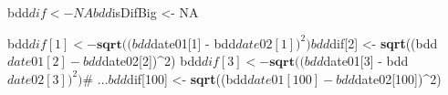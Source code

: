 \documentclass[twoside,symmetric]{book}
\newenvironment{Shaded}{}{}
\newcommand{\CommentTok}[1]{\textit{#1}}
\newcommand{\DecValTok}[1]{#1}
\newcommand{\KeywordTok}[1]{\textbf{#1}}
\newcommand{\NormalTok}[1]{#1}
\newcommand{\OperatorTok}[1]{#1}
\newcommand{\OtherTok}[1]{#1}
\newcommand{\StringTok}[1]{#1}
\begin{document}
\begin{Shaded}
\begin{Highlighting}[]
\NormalTok{bdd}\OperatorTok{$}\NormalTok{dif <-}\StringTok{ }\OtherTok{NA}
\NormalTok{bdd}\OperatorTok{$}\NormalTok{isDifBig <-}\StringTok{ }\OtherTok{NA}

\NormalTok{bdd}\OperatorTok{$}\NormalTok{dif[}\DecValTok{1}\NormalTok{] <-}\StringTok{ }\KeywordTok{sqrt}\NormalTok{((bdd}\OperatorTok{$}\NormalTok{date01[}\DecValTok{1}\NormalTok{] }\OperatorTok{-}\StringTok{ }\NormalTok{bdd}\OperatorTok{$}\NormalTok{date02[}\DecValTok{1}\NormalTok{])}\OperatorTok{^}\DecValTok{2}\NormalTok{)}
\NormalTok{bdd}\OperatorTok{$}\NormalTok{dif[}\DecValTok{2}\NormalTok{] <-}\StringTok{ }\KeywordTok{sqrt}\NormalTok{((bdd}\OperatorTok{$}\NormalTok{date01[}\DecValTok{2}\NormalTok{] }\OperatorTok{-}\StringTok{ }\NormalTok{bdd}\OperatorTok{$}\NormalTok{date02[}\DecValTok{2}\NormalTok{])}\OperatorTok{^}\DecValTok{2}\NormalTok{)}
\NormalTok{bdd}\OperatorTok{$}\NormalTok{dif[}\DecValTok{3}\NormalTok{] <-}\StringTok{ }\KeywordTok{sqrt}\NormalTok{((bdd}\OperatorTok{$}\NormalTok{date01[}\DecValTok{3}\NormalTok{] }\OperatorTok{-}\StringTok{ }\NormalTok{bdd}\OperatorTok{$}\NormalTok{date02[}\DecValTok{3}\NormalTok{])}\OperatorTok{^}\DecValTok{2}\NormalTok{)}
\CommentTok{# ...}
\NormalTok{bdd}\OperatorTok{$}\NormalTok{dif[}\DecValTok{100}\NormalTok{] <-}\StringTok{ }\KeywordTok{sqrt}\NormalTok{((bdd}\OperatorTok{$}\NormalTok{date01[}\DecValTok{100}\NormalTok{] }\OperatorTok{-}\StringTok{ }\NormalTok{bdd}\OperatorTok{$}\NormalTok{date02[}\DecValTok{100}\NormalTok{])}\OperatorTok{^}\DecValTok{2}\NormalTok{)}


\end{Highlighting}
\end{Shaded}
\end{document}
